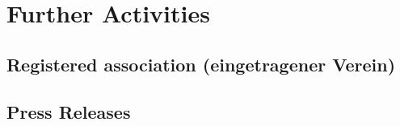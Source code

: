 ﻿\section{Further Activities}\label{sct:further_activities}

\subsection{Registered association (eingetragener Verein)}
\tbc[by DB]

\subsection{Press Releases}
\tbc[by DB]

